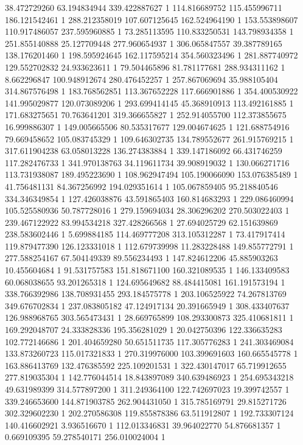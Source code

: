 38.472729260	63.194834944	339.422887627	1
114.816689752	115.455996711	186.121542461	1
288.212358019	107.607125645	162.524964190	1
153.553898607	110.917486057	237.595960885	1
73.285113595	110.833250531	143.798934358	1
251.855140888	25.127709448	277.960654937	1
306.065847557	39.387789165	138.176201460	1
198.595924645	162.117595214	354.560323496	1
281.887740972	129.552702832	24.933623611	1
79.504465896	81.781177681	288.934311162	1
8.662296847	100.948912674	280.476452257	1
257.867069694	35.988105404	314.867576498	1
183.768562851	113.367652228	117.666901886	1
354.400530922	141.995029877	120.073089206	1
293.699414145	45.368910913	113.492161885	1
171.683275651	70.763641201	319.366655827	1
252.914055700	112.373855675	16.999886307	1
149.005665506	80.535317677	129.004674625	1
121.688754916	79.669458652	105.083745329	1
109.646302735	134.789552677	261.915769215	1
317.611904238	63.058013228	136.274383884	1
339.147186092	66.431746259	117.282476733	1
341.970138763	34.119611734	39.908919032	1
130.066271716	113.731938087	189.495223690	1
108.962947494	105.190066090	153.076385489	1
41.756481131	84.367256992	194.029351614	1
105.067859405	95.218840546	334.346349854	1
127.426038876	43.591865403	160.814683293	1
229.086460994	105.525580936	50.787728016	1
279.159694034	28.306296202	270.503022403	1
239.467122922	83.994534218	327.428266568	1
27.694025729	62.151639869	238.583602446	1
5.699884185	114.469777208	313.105312287	1
73.417917414	119.879477390	126.123331018	1
112.679739998	11.283228488	149.855772791	1
277.588254167	67.504149339	89.556234493	1
147.824612206	45.885903263	10.455604684	1
91.531757583	151.818671100	160.321089535	1
146.133409583	60.068038655	93.201265318	1
124.695649682	88.484415081	161.191573194	1
338.766392986	138.708931455	293.184575778	1
203.106525922	74.267813769	349.676702834	1
237.083805182	47.124917134	20.391665949	1
308.433407637	126.988968765	303.565473431	1
28.669765899	108.293300873	325.410681811	1
169.292048707	24.333828336	195.356281029	1
20.042750396	122.336635283	102.772146686	1
201.404659280	50.651511735	117.305776283	1
241.303469084	133.873260723	115.017321833	1
270.319976000	103.399691603	160.665545778	1
163.886413769	132.476385592	225.109201531	1
322.430147017	65.719912655	277.819035304	1
142.776044514	18.843897089	340.639486923	1
254.695343218	49.631989399	314.577897200	1
311.249364100	122.742697023	19.399742557	1
339.246653600	144.871903785	262.904431050	1
315.785169791	29.815271726	302.329602230	1
202.270586308	119.855878386	63.511912807	1
192.733307124	140.416602921	3.936516670	1
112.013346831	39.964022770	54.876681357	1
0.669109395	59.278540171	256.010024004	1
